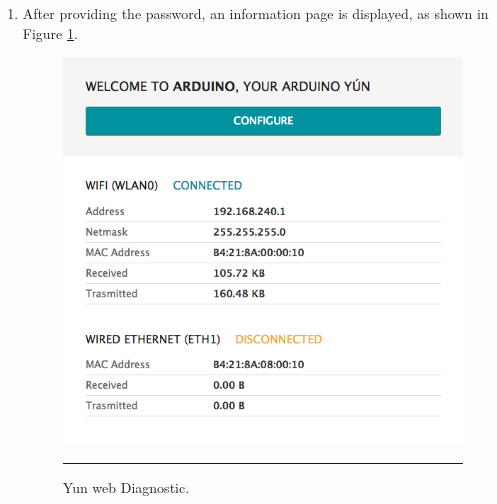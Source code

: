 \documentclass[12pt, a4paper,twoside]{tesi_upf}
\begin{document}
\begin{enumerate}
        \item After providing the password, an information page is displayed, as shown in Figure \ref{fig:YunWebDiagnostic}.
          \begin{figure}[htbp]
            \centering
                \includegraphics[scale=0.3]{./Figures/YunWebDiagnostic.png}
                \\
                \rule{15em}{0.5pt}
            \caption[Yun web Diagnostic]{Yun web Diagnostic.}
            \label{fig:YunWebDiagnostic}
          \end{figure}
        

\end{enumerate}
\end{document}
